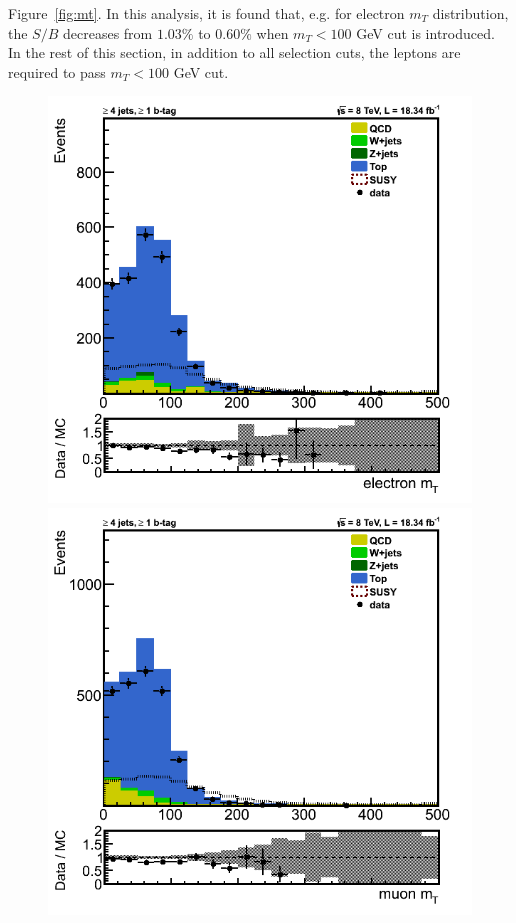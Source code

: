 Figure~\ref{fig:mt}. In this analysis, 
it is found that, e.g. for electron $m_T$ distribution, the $S/B$ decreases from $1.03\%$ to $0.60\%$ when $m_T<100$ GeV cut is introduced. In 
the rest of this section, in addition to all selection cuts, the leptons are required to pass $m_T<100$ GeV cut.\\ 
\begin{figure}[htbp] 
\centering
\includegraphics[angle=0,scale=0.35]{llplots_20Invfb/ele_mt.png} 
\includegraphics[angle=0,scale=0.35]{llplots_20Invfb/mu_mt.png} \\

\end{figure}
